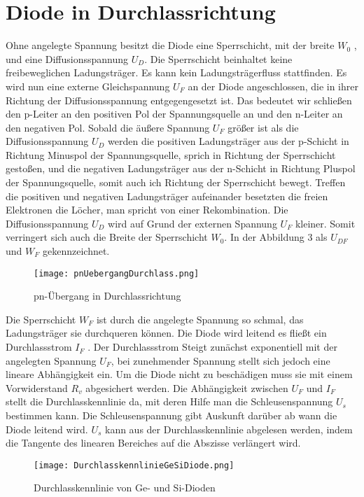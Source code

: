 \section{Diode in Durchlassrichtung} \label{sec:DiodeInDurchlassrichtung}
Ohne angelegte Spannung besitzt die Diode eine Sperrschicht, mit der breite $W_{0}$ , und eine Diffusionsspannung $U_{D}$. Die Sperrschicht beinhaltet keine freibeweglichen Ladungsträger. Es kann kein Ladungsträgerfluss stattfinden. Es wird nun eine externe Gleichspannung $U_{F}$ an der Diode angeschlossen, die in ihrer Richtung der Diffusionsspannung entgegengesetzt ist. Das bedeutet wir schließen  den p-Leiter an den positiven Pol der Spannungsquelle an und den n-Leiter an den negativen Pol. Sobald die äußere Spannung $U_{F}$ größer ist als die Diffusionsspannung $U_{D}$ werden die positiven Ladungsträger aus der p-Schicht in Richtung Minuspol der Spannungsquelle, sprich in Richtung der Sperrschicht gestoßen, und die negativen Ladungsträger aus der n-Schicht in Richtung Pluspol der Spannungsquelle, somit auch ich Richtung der Sperrschicht bewegt. Treffen die positiven und negativen Ladungsträger aufeinander besetzten die freien Elektronen die Löcher, man spricht von einer Rekombination. Die Diffusionsspannung $U_{D}$ wird auf Grund der externen Spannung $U_{F}$ kleiner. Somit verringert sich auch die Breite der Sperrschicht $W_{0}$. In der Abbildung 3 als $U_{DF}$ und $W_{F}$ gekennzeichnet. 

\begin{figure}[!htb]
\centering
\texttt{[image: pnUebergangDurchlass.png]}
\caption{pn-Übergang in Durchlassrichtung \cite{Stiny2018}}
\end{figure}

Die Sperrschicht $W_{F}$ ist durch die angelegte Spannung so schmal, das Ladungsträger sie durchqueren können. Die Diode wird leitend es fließt ein Durchlassstrom $I_{F}$ . Der Durchlassstrom Steigt zunächst exponentiell mit der angelegten Spannung $U_{F}$, bei zunehmender Spannung stellt sich jedoch eine lineare Abhängigkeit ein. Um die Diode nicht zu beschädigen muss sie mit einem Vorwiderstand $R_{v}$ abgesichert werden. Die Abhängigkeit zwischen $U_{F}$ und $I_{F}$ stellt die Durchlasskennlinie da, mit deren Hilfe man die Schleusenspannung $U_{s}$ bestimmen kann. Die Schleusenspannung gibt Auskunft darüber ab wann die Diode leitend wird. $U_{s}$ kann aus der Durchlasskennlinie abgelesen werden, indem die Tangente des linearen Bereiches auf die Abszisse verlängert wird. 

\begin{figure}[!htb]
\centering
\texttt{[image: DurchlasskennlinieGeSiDiode.png]}
\caption{Durchlasskennlinie von Ge- und Si-Dioden \cite{Stiny2018}}
\end{figure}

